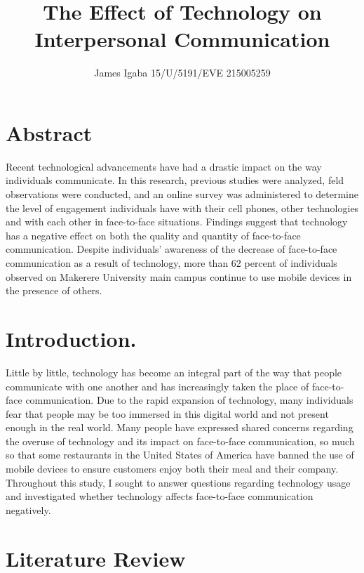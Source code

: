 \documentclass[11pt]{article} %
\title{The Effect of Technology on Interpersonal Communication}
\author{James Igaba 15/U/5191/EVE 215005259}
\begin{document}
\maketitle

\section{Abstract }

Recent technological advancements have had a drastic impact on the way individuals communicate. In this research, previous studies were analyzed, feld observations were conducted, and an online survey was administered to determine the level of engagement individuals have with their cell phones, other technologies and with each other in face-to-face situations. Findings suggest that technology has a negative effect on both the quality and quantity of face-to-face communication.
\newline Despite individuals’ awareness of the decrease of face-to-face communication as a result of technology, more than 62 percent of individuals observed on Makerere University main campus continue to use mobile devices in the presence of others. 

\section{Introduction.}

 Little by little, technology has become an integral part of the way that people communicate with one another and has increasingly taken the place of face-to-face communication. Due to the rapid expansion of technology, many individuals fear that people may be too immersed in this digital world and not present enough in the real world.
Many people have expressed shared concerns regarding the overuse of technology and its impact on face-to-face communication, so much so that some restaurants in the United States of America have banned the use of mobile devices to ensure customers enjoy both their meal and their company.
\newline Throughout this study, I sought to answer questions regarding technology usage and investigated whether technology affects face-to-face communication negatively. 

\section{Literature Review}
\end{document}
